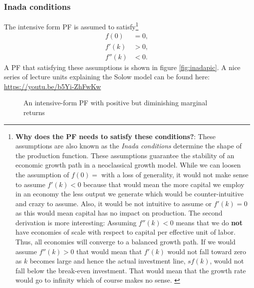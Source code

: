 \pbn
\subsubsection{Inada conditions}
The intensive form PF is assumed to satisfy\footnote{\textbf{Why does the PF needs to satisfy these conditions?}: These assumptions are also known as the \textit{Inada conditions} determine the shape of the production function. These assumptions guarantee the stability of an economic growth path in a neoclassical growth model. While we can loosen the assumption of $f(0)=$ with a loss of generality, it would not make sense to assume $f'(k)<0$ because that would mean the more capital we employ in an economy the less output we generate which would be counter-intuitive and crazy to assume. Also, it would be not intuitive to assume or $f'(k)=0$  as this would mean capital has no impact on production. The second derivation is more interesting: Assuming $f''(k)<0$ means that we do \textbf{not} have economies of scale with respect to capital per effective unit of labor. Thus, all economies will converge to a balanced growth path. If we would assume $f''(k)>0$ that would mean that $f'(k)$ would not fall toward zero as $k$ becomes large and hence the actual investment line, $sf(k)$, would not fall below the break-even investment. That would mean that the growth rate would go to infinity which of course makes no sense. \citep{Romer2006Advanced}}
\begin{align}
	f(0)&=0,\\
	f' (k)&>0,\\
	f'' (k)&<0.
\end{align}
A PF that satisfying these assumptions is shown in figure \autoref{fig:inadapic}. 
A nice series of lecture units explaining the Solow model can be found here: \tv \url{https://youtu.be/b5Yi-ZhFwKw}

\begin{figure}\centering
{}
\caption{An intensive-form PF with positive but diminishing marginal returns}\label{fig:inadapic}
\end{figure}

\pbn
